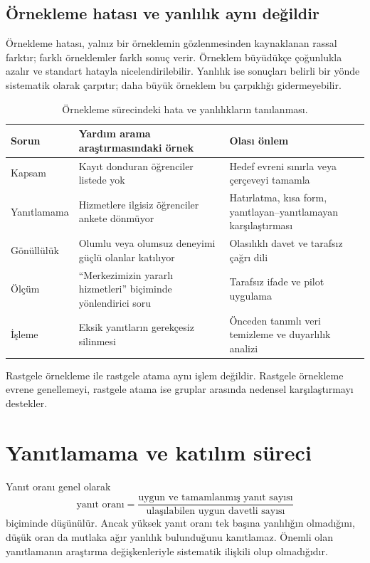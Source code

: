 \subsection{Örnekleme hatası ve yanlılık aynı değildir}

Örnekleme hatası, yalnız bir örneklemin gözlenmesinden kaynaklanan rassal
farktır; farklı örneklemler farklı sonuç verir. Örneklem büyüdükçe çoğunlukla
azalır ve standart hatayla nicelendirilebilir. Yanlılık ise sonuçları belirli
bir yönde sistematik olarak çarpıtır; daha büyük örneklem bu çarpıklığı
gidermeyebilir.

\begin{table}[htbp]
\centering
\caption{Örnekleme sürecindeki hata ve yanlılıkların tanılanması.}
\begin{tabular}{@{}p{}p{}p{}@{}}
\toprule
Sorun & Yardım arama araştırmasındaki örnek & Olası önlem \\
\midrule
Kapsam & Kayıt donduran öğrenciler listede yok & Hedef evreni sınırla veya çerçeveyi tamamla \\
Yanıtlamama & Hizmetlere ilgisiz öğrenciler ankete dönmüyor & Hatırlatma, kısa form, yanıtlayan--yanıtlamayan karşılaştırması \\
Gönüllülük & Olumlu veya olumsuz deneyimi güçlü olanlar katılıyor & Olasılıklı davet ve tarafsız çağrı dili \\
Ölçüm & ``Merkezimizin yararlı hizmetleri'' biçiminde yönlendirici soru & Tarafsız ifade ve pilot uygulama \\
İşleme & Eksik yanıtların gerekçesiz silinmesi & Önceden tanımlı veri temizleme ve duyarlılık analizi \\
\bottomrule
\end{tabular}
\end{table}

\begin{mistakebox}
Rastgele örnekleme ile rastgele atama aynı işlem değildir. Rastgele örnekleme
evrene genellemeyi, rastgele atama ise gruplar arasında nedensel karşılaştırmayı
destekler.
\end{mistakebox}

\section{Yanıtlamama ve katılım süreci}

Yanıt oranı genel olarak
\[
\text{yanıt oranı}=\frac{\text{uygun ve tamamlanmış yanıt sayısı}}
{\text{ulaşılabilen uygun davetli sayısı}}
\]
biçiminde düşünülür. Ancak yüksek yanıt oranı tek başına yanlılığın olmadığını,
düşük oran da mutlaka ağır yanlılık bulunduğunu kanıtlamaz. Önemli olan
yanıtlamanın araştırma değişkenleriyle sistematik ilişkili olup olmadığıdır.

